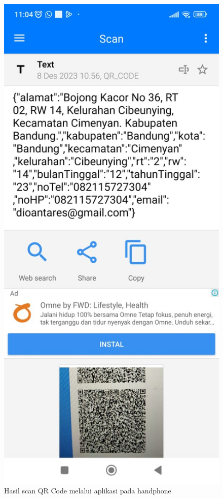 \begin{figure}[H]
	\centering
	\includegraphics[scale=0.4]{Gambar/hasilScan.jpg}
	\caption{Hasil scan QR Code melalui aplikasi pada handphone} 
	\label{fig:hasilScan}
\end{figure}

